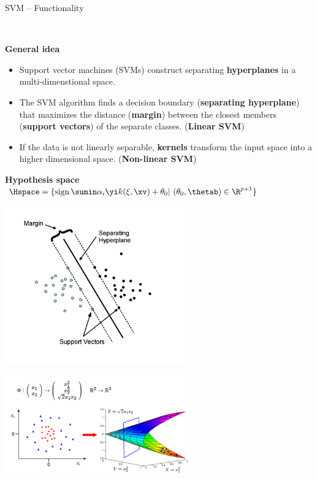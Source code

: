 \documentclass[11pt,compress,t,notes=noshow, xcolor=table]{beamer}
\newcommand{\maketag}[1]{\colorbox{highlightcol}{\textcolor{white}
{\MakeUppercase{#1}}}}
\newcommand{\highlight}[1]{\textcolor{highlightcol}{\textbf{#1}}}
\begin{document}
\begin{frame}{SVM -- Functionality}

\footnotesize

\maketag{SUPERVISED}
\maketag{|non| PARAMETRIC}
\maketag{WHITE-BOX}

\medskip

\highlight{General idea}
\begin{itemize}

\item Support vector machines (SVMs) construct separating \textbf{hyperplanes} in a multi-dimenstional space.  

\item The SVM algorithm finds a decision boundary (\textbf{separating hyperplane}) that maximizes the distance (\textbf{margin}) between the closest members (\textbf{support vectors}) of the separate classes. (\textbf{Linear SVM})

\item If the data is not linearly separable, \textbf{kernels} transform the input space into a higher dimensional space. (\textbf{Non-linear SVM})

\end{itemize}

\medskip


\highlight{Hypothesis space} ~~
\textcolor{red}{$\Hspace = \{ \operatorname{sign}\sumin \alpha_i \yi k(\xi, \xv)  + \theta_0  |\ (\theta_0, \thetab) \in \R^{p+1} \} $}

\medskip
 \footnotesize
 \begin{minipage}{0.4\textwidth}
\centering
 \includegraphics[width=0.6\textwidth]{figure/svm_wording.png}
 \end{minipage}
  \normalsize
 \begin{minipage}{0.5\textwidth}
 \centering
 \includegraphics[width=0.6\textwidth]{figure/svm_kernel.PNG}
   
 \end{minipage}

\end{frame}
\end{document}
